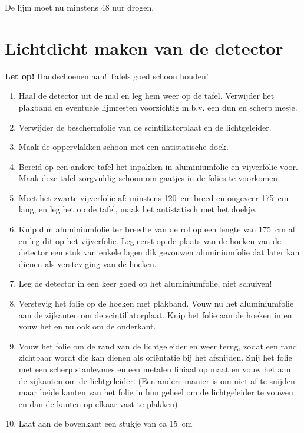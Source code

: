 De lijm moet nu minstens 48 uur drogen.


\section{Lichtdicht maken van de detector}

\textbf{Let op!} Handschoenen aan! Tafels goed schoon houden!

\begin{enumerate}
    \item Haal de detector uit de mal en leg hem weer op de tafel.
    Verwijder het plakband en eventuele lijmresten voorzichtig m.b.v.
    een dun en scherp mesje.
    \item Verwijder de beschermfolie van de scintillatorplaat en de
    lichtgeleider.
    \item Maak de oppervlakken schoon met een antistatische doek.
    \item Bereid op een andere tafel het inpakken in aluminiumfolie en
    vijverfolie voor. Maak deze tafel zorgvuldig schoon om gaatjes in de
    folies te voorkomen.
    \item Meet het zwarte vijverfolie af: minstens
    \SI{120}{\centi\meter} breed en ongeveer \SI{175}{\centi\meter}
    lang, en leg het op de tafel, maak het antistatisch met het doekje.
    \item Knip dun aluminiumfolie ter breedte van de rol op een lengte
    van \SI{175}{\centi\meter} af en leg dit op het vijverfolie. Leg
    eerst op de plaats van de hoeken van de detector een stuk van enkele
    lagen dik gevouwen aluminiumfolie dat later kan dienen als
    versteviging van de hoeken.
    \item Leg de detector in een keer goed op het aluminiumfolie, niet
    schuiven!
    \item Verstevig het folie op de hoeken met plakband. Vouw nu het
    aluminiumfolie aan de zijkanten om de scintillatorplaat. Knip het
    folie aan de hoeken in en vouw het en nu ook om de onderkant.
    \item Vouw het folie om de rand van de lichtgeleider en weer terug,
    zodat een rand zichtbaar wordt die kan dienen als oriëntatie bij
    het afsnijden. Snij het folie met een scherp stanleymes en een
    metalen liniaal op maat en vouw het aan de zijkanten om de
    lichtgeleider. (Een andere manier is om niet af te snijden maar
    beide kanten van het folie in hun geheel om de lichtgeleider te
    vouwen en dan de kanten op elkaar vast te plakken).
    \item Laat aan de bovenkant een stukje van ca \SI{15}{\centi\meter}

\end{enumerate}
